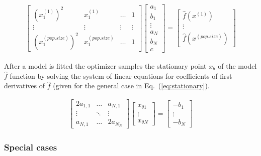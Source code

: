 \documentclass[sigconf]{acmart}
\begin{document}
\begin{align}
	\begin{bmatrix}
		(x^{(1)}_1)^2 & x^{(1)}_1 &  \ldots & 1 \\           
   \vdots & \vdots  & \vdots &  \vdots  \\
   (x^{(pop.size)}_1)^2 & x^{(pop.size)}_1 & \ldots & 1
  \end{bmatrix} 
  \begin{bmatrix}
	a_{1} \\           
	b_{1} \\           
	\vdots \\
	a_{N} \\           
	b_{N} \\           
	c
   \end{bmatrix}
	=
	\begin{bmatrix}
		\hat{f}(x^{(1)}) \\           
		\vdots \\
		\hat{f}(x^{(pop.size)})
	   \end{bmatrix}
	 \label{eq:coef}
\end{align}

After a model is fitted the optimizer samples the stationary point $x_\theta$
of the model $\hat{f}$ function by solving the system of linear equations for coefficients of first derivatives of $\hat{f}$ (given for the general case in Eq.~(\ref{eq:stationary}).

\begin{align}
			\begin{bmatrix}
				2a_{1,1} & \ldots & a_{N,1} \\           
           \vdots & \ddots & \vdots   \\
           a_{N,1} & \ldots & 2a_{N_N}
          \end{bmatrix} 
		  \begin{bmatrix}
			x_{\theta1} \\           
			\vdots \\
			x_{\theta N}
		   \end{bmatrix}
			=
	  \begin{bmatrix}
           -b_1 \\
           \vdots \\
           -b_N
         \end{bmatrix}
		 \label{eq:stationary}
  \end{align}

\subsubsection{Special cases}
\end{document}
